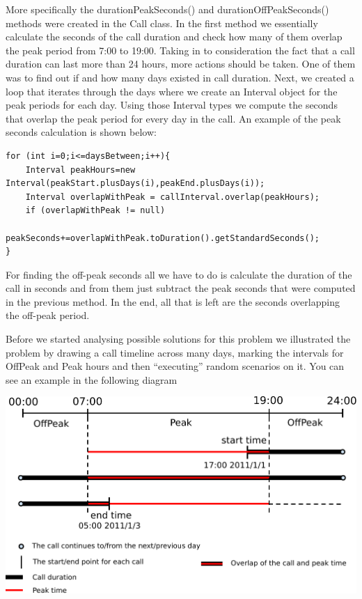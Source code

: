 \documentclass[pdftex,11pt,a4paper]{article}
\begin{document}
More specifically the durationPeakSeconds() and  durationOffPeakSeconds() methods were created in the Call class. In the first method we essentially calculate the seconds of the call duration and check how many of them overlap the peak period from 7:00 to 19:00. Taking in to consideration the fact that a call duration can last more than 24 hours, more actions should be taken. One of them was to find out if and how many days existed in call duration. Next, we created a loop that iterates through the days where we create an Interval object for the peak periods for each day. Using those Interval types we compute the seconds that overlap the peak period for every day in the call. An example of the peak seconds calculation is shown below:

\begin{lstlisting}
for (int i=0;i<=daysBetween;i++){
	Interval peakHours=new Interval(peakStart.plusDays(i),peakEnd.plusDays(i));
	Interval overlapWithPeak = callInterval.overlap(peakHours);
	if (overlapWithPeak != null)
		peakSeconds+=overlapWithPeak.toDuration().getStandardSeconds();
}
\end{lstlisting}

For finding the off-peak seconds all we have to do is calculate the duration of the call in seconds and from them just subtract the peak seconds that were computed in the previous method. In the end, all that is left are the seconds overlapping the off-peak period.

Before we started analysing possible solutions for this problem we illustrated the problem by drawing a call timeline across many days, marking the intervals for OffPeak and Peak hours and then “executing” random scenarios on it. You can see an example in the following diagram

\begin{center}
	\includegraphics[scale=0.75]{images/timeline.pdf}
\end{center}
\end{document}
